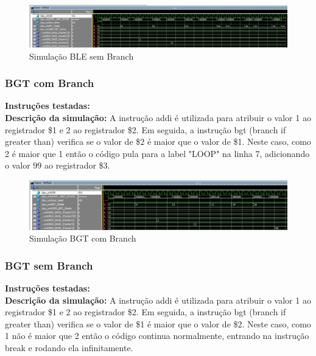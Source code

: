 \begin{figure}[htbp!]
\centering
\includegraphics[width=1\textwidth]{figure/simulacao_ble_sem_branch.png}
\caption{Simulação BLE sem Branch} 
\label{fig:imagem_massa}
\end{figure}

\subsubsection{BGT com Branch}
\textbf{Instruções testadas:}
 \\

\textbf{Descrição da simulação:} A instrução addi é utilizada para atribuir o valor 1 ao registrador \$1 e 2 ao registrador \$2. Em seguida, a instrução bgt (branch if greater than) verifica se o valor de \$2 é maior que o valor de \$1. Neste caso, como 2 é maior que 1 então o código pula para a label "LOOP" na linha 7, adicionando o valor 99 ao registrador \$3.\\

\begin{figure}[htbp!]
\centering
\includegraphics[width=1\textwidth]{figure/simulacao_bgt_com_branch.png}
\caption{Simulação BGT com Branch} 
\label{fig:imagem_massa}
\end{figure}

\newpage

\subsubsection{BGT sem Branch}
\textbf{Instruções testadas:}
 \\

\textbf{Descrição da simulação:} A instrução addi é utilizada para atribuir o valor 1 ao registrador \$1 e 2 ao registrador \$2. Em seguida, a instrução bgt (branch if greater than) verifica se o valor de \$1 é maior que o valor de \$2. Neste caso, como 1 não é maior que 2 então o código continua normalmente, entrando na instrução break e rodando ela infinitamente.\\


